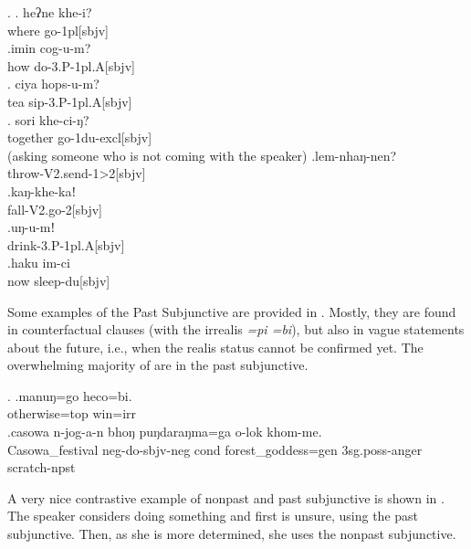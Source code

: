 \ex. \ag. heʔne khe-i?\\
		where go{\sc -1pl[sbjv]}	\\
	 \bg.imin cog-u-m?\\
 how do{\sc -3.P-1pl.A[sbjv]}\\
	 \bg. ciya hops-u-m?\\
		tea sip{\sc -3.P-1pl.A[sbjv]}	\\
	 \bg. sori khe-ci-ŋ?\\
	together go{\sc -1du-excl[sbjv]}\\
	 (asking someone who is not coming with the speaker)
	\bg.lem-nhaŋ-nen?\\
  throw{\sc -V2.send-1>2[sbjv]}\\
  \bg.kaŋ-khe-kaǃ\\
 fall{\sc -V2.go-2[sbjv]}\\
  \bg.uŋ-u-mǃ\\
  drink{\sc -3.P-1pl.A[sbjv]}\\
  \bg.haku im-ci\\
  now sleep{\sc -du[sbjv]}\\
  
Some examples of the Past  Subjunctive are provided in \Next. Mostly, they are found in counterfactual clauses (with the irrealis  \emph{=pi \ti =bi}), but also in vague statements about the future, i.e., when the realis status cannot be confirmed yet. The overwhelming majority of  are in the past subjunctive.
  
  \ex. \ag.manuŋ=go heco=bi.\\
  otherwise{\sc =top} win{\sc [3sg;sbjv]=irr}\\
  \bg.casowa           n-jog-a-n     bhoŋ puŋdaraŋma=ga      o-lok     khom-me.\\
  Casowa\_festival {\sc neg-}do{\sc [3sg]-sbjv-neg} {\sc cond} forest\_goddess{\sc =gen} {\sc 3sg.poss-}anger scratch{\sc [3sg]-npst}\\
   
  
A very nice contrastive  example of  nonpast and  past subjunctive is shown in \Next. The speaker considers doing something and first is unsure, using the past subjunctive. Then, as she is more determined, she uses the nonpast subjunctive.

